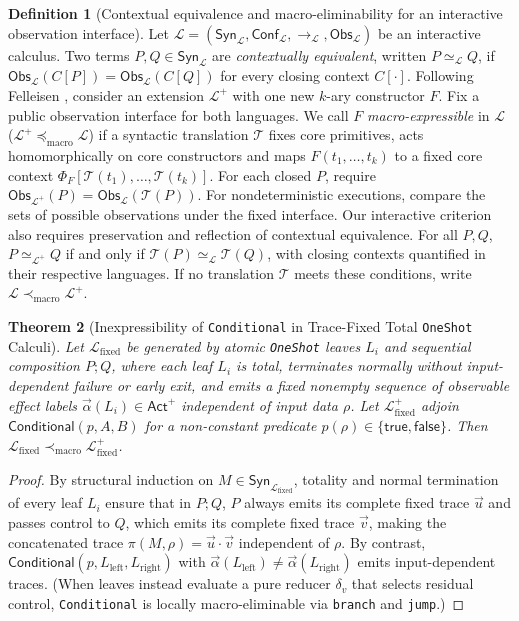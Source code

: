 \documentclass[11pt,a4paper]{article}
\newtheorem{theorem}{Theorem}[section]
\theoremstyle{definition}
\newtheorem{definition}[theorem]{Definition}
\theoremstyle{remark}
\newcommand{\Act}{\mathsf{Act}}
\newcommand{\Obs}{\mathsf{Obs}}
\newcommand{\Conf}{\mathsf{Conf}}
\begin{document}
\begin{definition}[Contextual equivalence and macro-eliminability for an interactive observation interface]
Let $\mathcal{L} = (\mathsf{Syn}_{\mathcal{L}}, \Conf_{\mathcal{L}}, \longrightarrow_{\mathcal{L}}, \Obs_{\mathcal{L}})$ be an interactive calculus. Two terms $P, Q \in \mathsf{Syn}_{\mathcal{L}}$ are \emph{contextually equivalent}, written $P \simeq_{\mathcal{L}} Q$, if $\Obs_{\mathcal{L}}(C[P]) = \Obs_{\mathcal{L}}(C[Q])$ for every closing context $C[\cdot]$.
Following Felleisen \cite{felleisen1991expressive}, consider an extension $\mathcal{L}^+$ with one new $k$-ary constructor $F$. Fix a public observation interface for both languages. We call $F$ \emph{macro-expressible} in $\mathcal{L}$ ($\mathcal{L}^+ \preceq_{\text{macro}} \mathcal{L}$) if a syntactic translation $\mathcal{T}$ fixes core primitives, acts homomorphically on core constructors and maps $F(t_1,\dots,t_k)$ to a fixed core context $\Phi_F[\mathcal{T}(t_1),\dots,\mathcal{T}(t_k)]$.
For each closed $P$, require $\Obs_{\mathcal{L}^+}(P)=\Obs_{\mathcal{L}}(\mathcal{T}(P))$. For nondeterministic executions, compare the sets of possible observations under the fixed interface. Our interactive criterion also requires preservation and reflection of contextual equivalence. For all $P,Q$, $P\simeq_{\mathcal{L}^+}Q$ if and only if $\mathcal{T}(P)\simeq_{\mathcal{L}}\mathcal{T}(Q)$, with closing contexts quantified in their respective languages.
If no translation $\mathcal{T}$ meets these conditions, write $\mathcal{L}\prec_{\text{macro}}\mathcal{L}^+$.
\end{definition}

\begin{theorem}[Inexpressibility of \texttt{Conditional} in Trace-Fixed Total \texttt{OneShot} Calculi]
\label{thm:oneshot}
Let $\mathcal{L}_{\text{fixed}}$ be generated by atomic \texttt{OneShot} leaves $L_i$ and sequential composition $P ; Q$, where each leaf $L_i$ is total, terminates normally without input-dependent failure or early exit, and emits a fixed nonempty sequence of observable effect labels $\vec{\alpha}(L_i) \in \Act^+$ independent of input data $\rho$. Let $\mathcal{L}_{\text{fixed}}^+$ adjoin $\mathsf{Conditional}(p, A, B)$ for a non-constant predicate $p(\rho) \in \{\mathsf{true}, \mathsf{false}\}$. Then $\mathcal{L}_{\text{fixed}} \prec_{\text{macro}} \mathcal{L}_{\text{fixed}}^+$.
\end{theorem}
\begin{proof}
By structural induction on $M \in \mathsf{Syn}_{\mathcal{L}_{\text{fixed}}}$, totality and normal termination of every leaf $L_i$ ensure that in $P ; Q$, $P$ always emits its complete fixed trace $\vec{u}$ and passes control to $Q$, which emits its complete fixed trace $\vec{v}$, making the concatenated trace $\pi(M, \rho) = \vec{u}\cdot\vec{v}$ independent of $\rho$. By contrast, $\mathsf{Conditional}(p, L_{\text{left}}, L_{\text{right}})$ with $\vec{\alpha}(L_{\text{left}}) \ne \vec{\alpha}(L_{\text{right}})$ emits input-dependent traces. (When leaves instead evaluate a pure reducer $\delta_v$ that selects residual control, \texttt{Conditional} is locally macro-eliminable via \texttt{branch} and \texttt{jump}.)
\end{proof}
\end{document}
